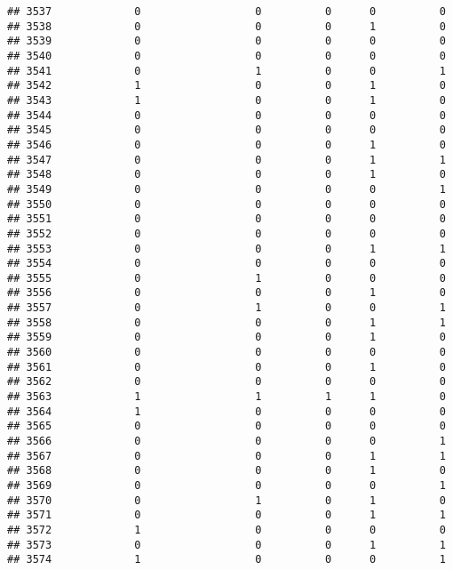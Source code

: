 \documentclass[
]{article}
\begin{document}
\begin{verbatim}
## 3537             0                  0          0      0          0
## 3538             0                  0          0      1          0
## 3539             0                  0          0      0          0
## 3540             0                  0          0      0          0
## 3541             0                  1          0      0          1
## 3542             1                  0          0      1          0
## 3543             1                  0          0      1          0
## 3544             0                  0          0      0          0
## 3545             0                  0          0      0          0
## 3546             0                  0          0      1          0
## 3547             0                  0          0      1          1
## 3548             0                  0          0      1          0
## 3549             0                  0          0      0          1
## 3550             0                  0          0      0          0
## 3551             0                  0          0      0          0
## 3552             0                  0          0      0          0
## 3553             0                  0          0      1          1
## 3554             0                  0          0      0          0
## 3555             0                  1          0      0          0
## 3556             0                  0          0      1          0
## 3557             0                  1          0      0          1
## 3558             0                  0          0      1          1
## 3559             0                  0          0      1          0
## 3560             0                  0          0      0          0
## 3561             0                  0          0      1          0
## 3562             0                  0          0      0          0
## 3563             1                  1          1      1          0
## 3564             1                  0          0      0          0
## 3565             0                  0          0      0          0
## 3566             0                  0          0      0          1
## 3567             0                  0          0      1          1
## 3568             0                  0          0      1          0
## 3569             0                  0          0      0          1
## 3570             0                  1          0      1          0
## 3571             0                  0          0      1          1
## 3572             1                  0          0      0          0
## 3573             0                  0          0      1          1
## 3574             1                  0          0      0          1

\end{verbatim}
\end{document}
